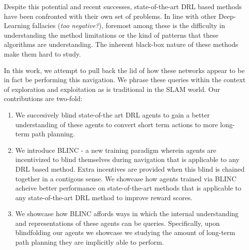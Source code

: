 Despite this potential and recent successes, state-of-the-art DRL based methods have been confronted with their own set of problems. In line with other Deep-Learning fallacies (\textit{too negative?}), foremost among these is the difficulty in understanding the method limitations or the kind of patterns that these algorithms are understanding. The inherent black-box nature of these methods make them hard to study. 

In this work, we attempt to pull back the lid of how these networks appear to be in fact be performing this navigation. We phrase these queries within the context of exploration and exploitation as is traditional in the SLAM world. Our contributions are two-fold:
\begin{enumerate}
\item We succesively blind state-of-the art DRL agents to gain a better understanding of these agents to convert short term actions to more long-term path planning. 
\item We introduce BLINC - a new training paradigm wherein agents are incentivized to blind themselves during navigation that is applicable to any DRL based method. Extra  incentives are provided when this blind is chained together in a contigous sense.  We showcase how agents trained via BLINC acheive better performance on state-of-the-art methods that is applicable to any state-of-the-art DRL method to improve reward scores. 
\item We showcase how BLINC affords ways in which the internal understanding and representations of these agents can be queries. Specifically, upon blindfolding our agents we showcase we studying the amount of long-term path planning they are implicitly able to perform. 
\end {enumerate}

